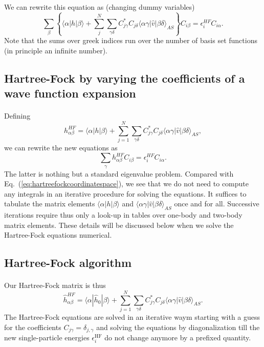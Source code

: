 \documentclass[%
twoside,                 %
final,                   %
10pt]{article}
\begin{document}
\paragraph{}
We can rewrite this equation as (changing dummy variables)
\[
\sum_{\beta} \left\{\langle \alpha | h | \beta \rangle+
\sum_{j}^N\sum_{\gamma\delta} C^*_{j\gamma}C_{j\delta}\langle \alpha\gamma|\hat{v}|\beta\delta\rangle_{AS}\right\}C_{i\beta}=\epsilon_i^{HF}C_{i\alpha}.
\]
Note that the sums over greek indices run over the number of basis set functions (in principle an infinite number).



\subsection{Hartree-Fock by varying the coefficients of a wave function expansion}

\paragraph{}
Defining 
\[
h_{\alpha\beta}^{HF}=\langle \alpha | h | \beta \rangle+
\sum_{j=1}^N\sum_{\gamma\delta} C^*_{j\gamma}C_{j\delta}\langle \alpha\gamma|\hat{v}|\beta\delta\rangle_{AS},
\]
we can rewrite the new equations as 
\begin{equation}
\sum_{\gamma}h_{\alpha\beta}^{HF}C_{i\beta}=\epsilon_i^{HF}C_{i\alpha}. \label{eq:newhf}
\end{equation}
The latter is nothing but a standard eigenvalue problem. Compared with Eq.~(\ref{eq:hartreefockcoordinatespace}),
we see that we do not need to compute any integrals in an iterative procedure for solving the equations.
It suffices to tabulate the matrix elements $\langle \alpha | h | \beta \rangle$ and $\langle \alpha\gamma|\hat{v}|\beta\delta\rangle_{AS}$ once and for all. Successive iterations require thus only a look-up in tables over one-body and two-body matrix elements. These details will be discussed below when we solve the Hartree-Fock equations numerical.



\subsection{Hartree-Fock algorithm}

\paragraph{}
Our Hartree-Fock matrix  is thus
\[
\hat{h}_{\alpha\beta}^{HF}=\langle \alpha | \hat{h}_0 | \beta \rangle+
\sum_{j=1}^N\sum_{\gamma\delta} C^*_{j\gamma}C_{j\delta}\langle \alpha\gamma|\hat{v}|\beta\delta\rangle_{AS}.
\]
The Hartree-Fock equations are solved in an iterative waym starting with a guess for the coefficients $C_{j\gamma}=\delta_{j,\gamma}$ and solving the equations by diagonalization till the new single-particle energies
$\epsilon_i^{\mathrm{HF}}$ do not change anymore by a prefixed quantity.
\end{document}
